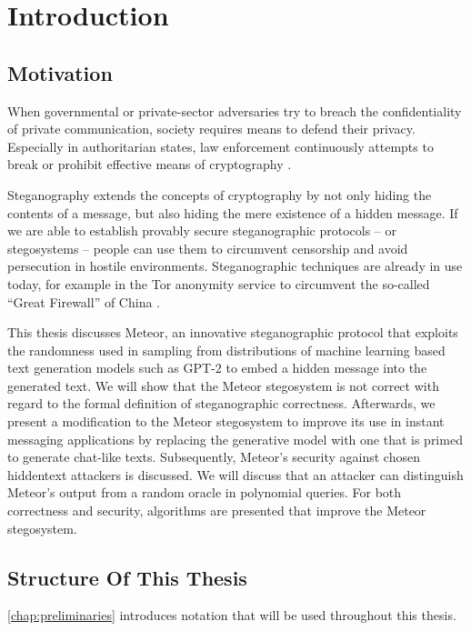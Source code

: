 \chapter{Introduction}

\section{Motivation}

When governmental or private-sector adversaries try to breach the confidentiality of private communication, society requires means to defend their privacy.
Especially in authoritarian states, law enforcement continuously attempts to break or prohibit effective means of cryptography \cite{TLSBlocking2020}.

Steganography extends the concepts of cryptography by not only hiding the contents of a message, but also hiding the mere existence of a hidden message.
If we are able to establish provably secure steganographic protocols -- or stegosystems -- people can use them to circumvent censorship and avoid persecution in hostile environments.
Steganographic techniques are already in use today, for example in the Tor anonymity service to circumvent the so-called ``Great Firewall'' of China \cite{TorBlocking2012}.

This thesis discusses Meteor, an innovative steganographic protocol that exploits the randomness used in sampling from distributions of machine learning based text generation models such as GPT-2 to embed a hidden message into the generated text.
We will show that the Meteor stegosystem is not correct with regard to the formal definition of steganographic correctness.
Afterwards, we present a modification to the Meteor stegosystem to improve its use in instant messaging applications by replacing the generative model with one that is primed to generate chat-like texts.
Subsequently, Meteor's security against chosen hiddentext attackers is discussed.
We will discuss that an attacker can distinguish Meteor's output from a random oracle in polynomial queries.
For both correctness and security, algorithms are presented that improve the Meteor stegosystem.


\section{Structure Of This Thesis}

\autoref{chap:preliminaries} introduces notation that will be used throughout this thesis.

